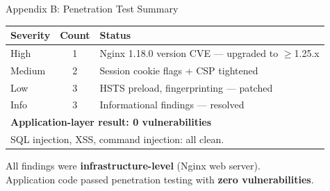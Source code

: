 \documentclass[10pt,aspectratio=169]{beamer}
\begin{document}
\begin{frame}{Appendix B: Penetration Test Summary}

    \small
    \begin{table}
        \centering
        \begin{tabular}{lcp{7.5cm}}
            \toprule
            \textbf{Severity} & \textbf{Count} & \textbf{Status} \\
            \midrule
            High   & 1 & Nginx 1.18.0 version CVE --- upgraded to $\geq$1.25.x \\
            Medium & 2 & Session cookie flags + CSP tightened \\
            Low    & 3 & HSTS preload, fingerprinting --- patched \\
            Info   & 3 & Informational findings --- resolved \\
            \midrule
            \multicolumn{3}{l}{\textbf{Application-layer result: 0 vulnerabilities}} \\
            \multicolumn{3}{l}{SQL injection, XSS, command injection: all clean.} \\
            \bottomrule
        \end{tabular}
    \end{table}

    \vspace{0.3cm}
    \centering
    All findings were \textbf{infrastructure-level} (Nginx web server).\\
    Application code passed penetration testing with \textbf{zero vulnerabilities}.
\end{frame}
\end{document}
